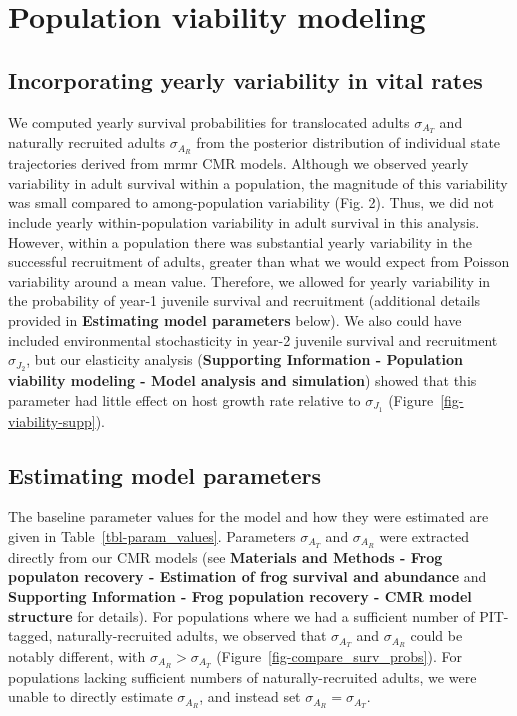 \documentclass[9pt,twoside,lineno]{pnas-new}
\begin{document}
\hypertarget{population-viability-modeling-1}{%
\section{Population viability
modeling}\label{population-viability-modeling-1}}

\hypertarget{incorporating-yearly-variability-in-vital-rates}{%
\subsection{Incorporating yearly variability in vital
rates}\label{incorporating-yearly-variability-in-vital-rates}}

We computed yearly survival probabilities for translocated adults
\(\sigma_{A_T}\) and naturally recruited adults \(\sigma_{A_R}\) from
the posterior distribution of individual state trajectories derived from
mrmr CMR models. Although we observed yearly variability in adult
survival within a population, the magnitude of this variability was
small compared to among-population variability
(Fig. 2). Thus, we did not include
yearly within-population variability in adult survival in this analysis.
However, within a population there was substantial yearly variability in
the successful recruitment of adults, greater than what we would expect
from Poisson variability around a mean value. Therefore, we allowed for
yearly variability in the probability of year-1 juvenile survival and
recruitment (additional details provided in \textbf{Estimating model
parameters} below). We also could have included environmental
stochasticity in year-2 juvenile survival and recruitment
\(\sigma_{J_2}\), but our elasticity analysis (\textbf{Supporting
Information - Population viability modeling - Model analysis and
simulation}) showed that this parameter had little effect on host growth
rate relative to \(\sigma_{J_1}\) (Figure~\ref{fig-viability-supp}).

\hypertarget{estimating-model-parameters}{%
\subsection{Estimating model
parameters}\label{estimating-model-parameters}}

The baseline parameter values for the model and how they were estimated
are given in Table~\ref{tbl-param_values}. Parameters \(\sigma_{A_T}\)
and \(\sigma_{A_R}\) were extracted directly from our CMR models (see
\textbf{Materials and Methods - Frog populaton recovery - Estimation of
frog survival and abundance} and \textbf{Supporting Information - Frog
population recovery - CMR model structure} for details). For populations
where we had a sufficient number of PIT-tagged, naturally-recruited
adults, we observed that \(\sigma_{A_T}\) and \(\sigma_{A_R}\) could be
notably different, with \(\sigma_{A_R} > \sigma_{A_T}\)
(Figure~\ref{fig-compare_surv_probs}). For populations lacking
sufficient numbers of naturally-recruited adults, we were unable to
directly estimate \(\sigma_{A_R}\), and instead set
\(\sigma_{A_R} = \sigma_{A_T}\).
\end{document}
